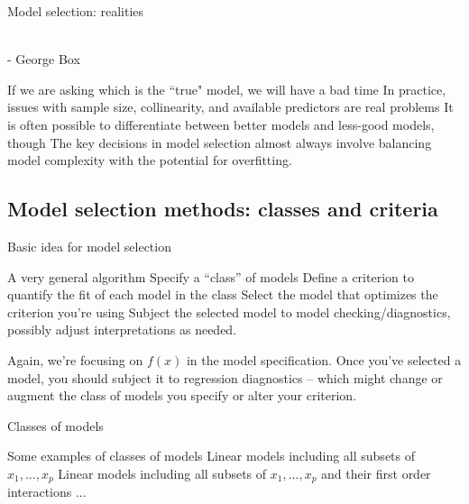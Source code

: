 

\begin{frame}{Model selection: realities}

 \\ - George Box


\bi
    \myitem If we are asking which is the ``true" model, we will have a bad time
	\myitem In practice, issues with sample size, collinearity, and available predictors are real problems
	\myitem It is often possible to differentiate between better models and less-good models, though
	\myitem The key decisions in model selection almost always involve balancing model complexity with the potential for overfitting.
\ei
\end{frame}



\subsection{Model selection methods: classes and criteria}




\begin{frame}{Basic idea for model selection}

\begin{block}{A very general algorithm}
\bi
        \myitem Specify a ``class'' of models
        \myitem Define a criterion to quantify the fit of each model in the class
        \myitem Select the model that optimizes the criterion you're using
        \myitem Subject the selected model to model checking/diagnostics, possibly adjust interpretations as needed.
\ei
\end{block}

Again, we're focusing on $f(x)$ in the model specification. Once you've selected a model, you should subject it to regression diagnostics -- which might change or augment the class of models you specify or alter your criterion.

\end{frame}


\begin{frame}{Classes of models}

\begin{block}{Some examples of classes of models}
\bi
        \myitem Linear models including all subsets of $x_1, ..., x_p$
        \myitem Linear models including all subsets of $x_1, ..., x_p$ and their first order interactions
        \myitem ...
\ei
\end{block}

\end{frame}

